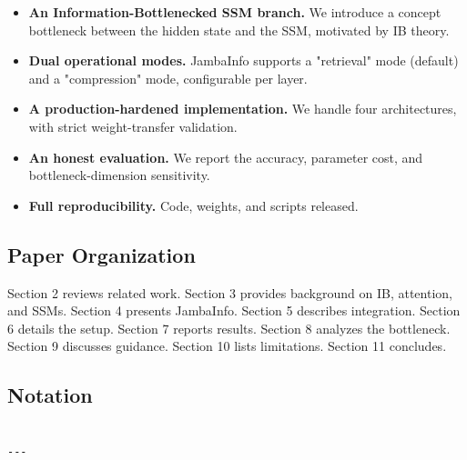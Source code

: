 \begin{itemize}
\item \textbf{An Information-Bottlenecked SSM branch.} We introduce a concept
  bottleneck between the hidden state and the SSM, motivated by IB theory.
\item \textbf{Dual operational modes.} JambaInfo supports a "retrieval" mode (default)
  and a "compression" mode, configurable per layer.
\item \textbf{A production-hardened implementation.} We handle four architectures,
  with strict weight-transfer validation.
\item \textbf{An honest evaluation.} We report the accuracy, parameter cost, and
  bottleneck-dimension sensitivity.
\item \textbf{Full reproducibility.} Code, weights, and scripts released.

\end{itemize}
\subsection{Paper Organization}

Section 2 reviews related work. Section 3 provides background on IB, 
attention, and SSMs. Section 4 presents JambaInfo. Section 5 describes 
integration. Section 6 details the setup. Section 7 reports results. 
Section 8 analyzes the bottleneck. Section 9 discusses guidance. Section 10 
lists limitations. Section 11 concludes.



\subsection{Notation}

\begin{lstlisting}

---
\end{lstlisting}